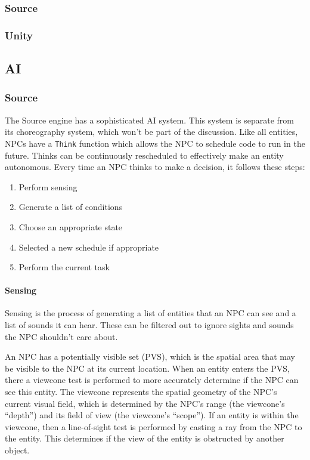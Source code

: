 \documentclass[a4paper, 12pt]{scrartcl}
\begin{document}
\subsubsection{Source}
\subsubsection{Unity}

\subsection{AI}
\subsubsection{Source}
The Source engine has a sophisticated AI system. This system is separate from its choreography system, which won't be part of the discussion. Like all entities, NPCs have a \texttt{Think} function which allows the NPC to schedule code to run in the future. Thinks can be continuously rescheduled to effectively make an entity autonomous. Every time an NPC thinks to make a decision, it follows these steps:

\begin{enumerate}
  \item Perform sensing
  \item Generate a list of conditions
  \item Choose an appropriate state
  \item Selected a new schedule if appropriate
  \item Perform the current task
\end{enumerate}

\paragraph{Sensing}
Sensing is the process of generating a list of entities that an NPC can see and a list of sounds it can hear. These can be filtered out to ignore sights and sounds the NPC shouldn't care about.

An NPC has a potentially visible set (PVS), which is the spatial area that may be visible to the NPC at its current location. When an entity enters the PVS, there a viewcone test is performed to more accurately determine if the NPC can see this entity. The viewcone represents the spatial geometry of the NPC's current visual field, which is determined by the NPC's range (the viewcone's ``depth'') and its field of view (the viewcone's ``scope''). If an entity is within the viewcone, then a line-of-sight test is performed by casting a ray from the NPC to the entity. This determines if the view of the entity is obstructed by another object.
\end{document}
